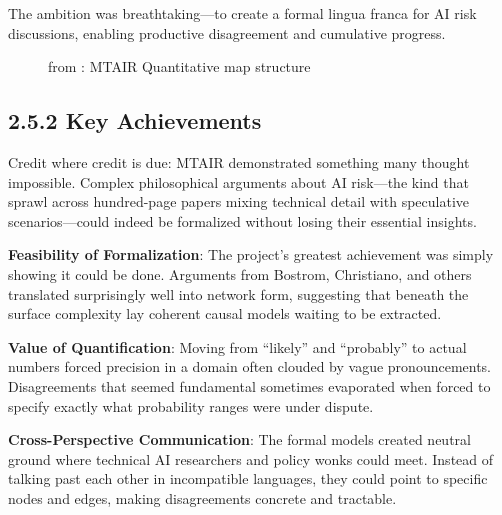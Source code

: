 \documentclass[
  11pt,
  letterpaper,
  openany]{book}
\begin{document}
The ambition was breathtaking---to create a formal lingua franca for AI
risk discussions, enabling productive disagreement and cumulative
progress.

\begin{figure}


\caption[MTAIR Quantitative map
structure]{\label{fig-mtair-quant-map}from \textcite{clarke2022}: MTAIR
Quantitative map structure}

\end{figure}%

\subsection{2.5.2 Key Achievements}\label{sec-mtair-achievements}

Credit where credit is due: MTAIR demonstrated something many thought
impossible. Complex philosophical arguments about AI risk---the kind
that sprawl across hundred-page papers mixing technical detail with
speculative scenarios---could indeed be formalized without losing their
essential insights.

\textbf{Feasibility of Formalization}: The project's greatest
achievement was simply showing it could be done. Arguments from Bostrom,
Christiano, and others translated surprisingly well into network form,
suggesting that beneath the surface complexity lay coherent causal
models waiting to be extracted.

\textbf{Value of Quantification}: Moving from ``likely'' and
``probably'' to actual numbers forced precision in a domain often
clouded by vague pronouncements. Disagreements that seemed fundamental
sometimes evaporated when forced to specify exactly what probability
ranges were under dispute.

\textbf{Cross-Perspective Communication}: The formal models created
neutral ground where technical AI researchers and policy wonks could
meet. Instead of talking past each other in incompatible languages, they
could point to specific nodes and edges, making disagreements concrete
and tractable.
\end{document}
